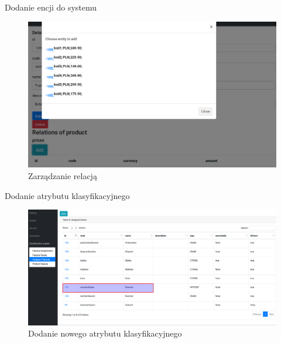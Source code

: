 \documentclass[polish,xcolor=table,9pt,aspectratio=1610,hyperref={pdfpagemode=FullScreen}]{beamer}
\begin{document}
\begin{frame}{Dodanie encji do systemu}
\begin{figure}
	\begin{center}
		\includegraphics[scale=0.3]{9.png}
\end{center}
\caption{{\color{black}Zarządzanie relacją}} 
\end{figure}
\end{frame}

\begin{frame}{Dodanie atrybutu klasyfikacyjnego}
\begin{figure}
	\begin{center}
		\includegraphics[scale=0.2]{10.png}
	\end{center}
	\caption{{\color{black}Dodanie nowego atrybutu klasyfikacyjnego}} 
\end{figure}
\end{frame}
\end{document}
